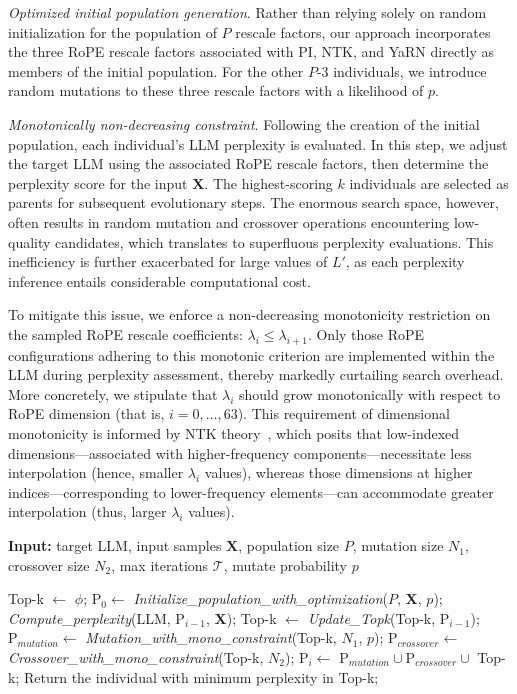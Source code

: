 \textit{Optimized initial population generation}. Rather than relying solely on random initialization for the population of $P$ rescale factors, our approach incorporates the three RoPE rescale factors associated with PI, NTK, and YaRN directly as members of the initial population. For the other $P$-3 individuals, we introduce random mutations to these three rescale factors with a likelihood of $p$.

\textit{Monotonically non-decreasing constraint}. Following the creation of the initial population, each individual's LLM perplexity is evaluated. In this step, we adjust the target LLM using the associated RoPE rescale factors, then determine the perplexity score for the input $\mathbf{X}$. The highest-scoring $k$ individuals are selected as parents for subsequent evolutionary steps. The enormous search space, however, often results in random mutation and crossover operations encountering low-quality candidates, which translates to superfluous perplexity evaluations. This inefficiency is further exacerbated for large values of $L'$, as each perplexity inference entails considerable computational cost.

To mitigate this issue, we enforce a non-decreasing monotonicity restriction on the sampled RoPE rescale coefficients: $\lambda_i\le \lambda_{i+1}$.
Only those RoPE configurations adhering to this monotonic criterion are implemented within the LLM during perplexity assessment, thereby markedly curtailing search overhead. More concretely, we stipulate that $\lambda_i$ should grow monotonically with respect to RoPE dimension (that is, $i=0,\ldots,63$). This requirement of dimensional monotonicity is informed by NTK theory~\cite{jacot2018neural,tancik2020fourier,ntk}, which posits that low-indexed dimensions—associated with higher-frequency components—necessitate less interpolation (hence, smaller $\lambda_i$ values), whereas those dimensions at higher indices—corresponding to lower-frequency elements—can accommodate greater interpolation (thus, larger $\lambda_i$ values).

\begin{algorithm}[t]
	\small
	\caption{The search algorithm}
	\textbf{Input:} target LLM, input samples $\mathbf{X}$,   population size $P$, mutation size $N_1$, crossover size $N_2$, max iterations $\mathcal{T}$, mutate probability $p$\\

	\begin{algorithmic}[1]
		\label{alg:search}
		\STATE Top-k $\gets$ $\phi$;	
		\STATE $\text{P}_0 \gets$ \textit{Initialize\_population\_with\_optimization}($P$, $\mathbf{X}$, $p$); 
		\STATE \textit{Compute\_perplexity}(LLM, $\text{P}_{i-1}$, $\mathbf{X}$);
		\STATE Top-k $\gets$ \textit{Update\_Topk}(Top-k, $\text{P}_{i-1}$);
		\STATE $\text{P}_{mutation} \gets$ \textit{Mutation\_with\_mono\_constraint}(Top-k, $N_1$, $p$); 
		\STATE $\text{P}_{crossover} \gets$ \textit{Crossover\_with\_mono\_constraint}(Top-k, $N_2$);
		\STATE $\text{P}_i \gets$ $\text{P}_{mutation} \cup \text{P}_{crossover} \cup$ Top-k;
		\ENDFOR
		\STATE Return the individual with minimum perplexity in Top-k;
	\end{algorithmic}
\end{algorithm}

